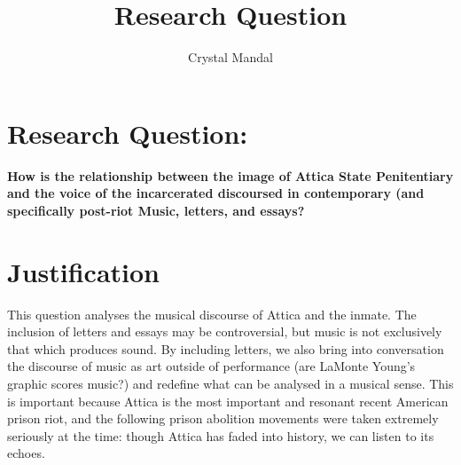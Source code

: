 \documentclass[12pt,letterpaper]{article}
\title{Research Question}
\author{Crystal Mandal}
\date{}
\begin{document}
\maketitle

\section*{Research Question:}
\textbf{How is the relationship between the image of Attica State Penitentiary 
and the voice of the incarcerated discoursed in contemporary (and specifically 
post-riot Music, letters, and essays?}

\section*{Justification}

This question analyses the musical discourse of Attica and the inmate. The 
inclusion of letters and essays may be controversial, but music is not exclusively 
that which produces sound. By including letters, we also bring into conversation 
the discourse of music as art outside of performance (are LaMonte Young's graphic 
scores music?) and redefine what can be analysed in a musical sense. This is 
important because Attica is the most important and resonant recent American 
prison riot, and the following prison abolition movements were taken extremely 
seriously at the time: though Attica has faded into history, we can listen to 
its echoes. 


\end{document}
